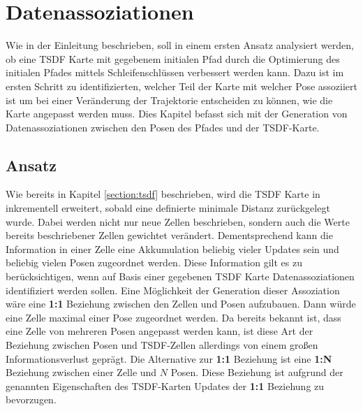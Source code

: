 \chapter{Datenassoziationen}\label{chapter:association}

Wie in der Einleitung beschrieben, soll in einem ersten Ansatz analysiert werden, ob eine TSDF Karte mit gegebenem initialen Pfad durch die Optimierung des initialen Pfades mittels Schleifenschlüssen verbessert werden kann. Dazu ist im ersten Schritt zu identifizierten, welcher Teil der Karte mit welcher Pose assoziiert ist um bei einer Veränderung der Trajektorie entscheiden zu können, wie die Karte angepasst werden muss. Dies Kapitel befasst sich mit der Generation von Datenassoziationen zwischen den Posen des Pfades und der TSDF-Karte.

\section{Ansatz}
\label{section:ansatz}

Wie bereits in Kapitel \ref{section:tsdf} beschrieben, wird die TSDF Karte in \cite{HATSDF} inkrementell erweitert, sobald eine definierte minimale Distanz zurückgelegt wurde. Dabei werden nicht nur neue Zellen beschrieben, sondern auch die Werte bereits beschriebener Zellen gewichtet verändert. Dementsprechend kann die Information in einer Zelle eine Akkumulation beliebig vieler Updates sein und beliebig vielen Posen zugeordnet werden. Diese Information gilt es zu berücksichtigen, wenn auf Basis einer gegebenen TSDF Karte Datenassoziationen identifiziert werden sollen.
Eine Möglichkeit der Generation dieser Assoziation wäre eine \textbf{1:1} Beziehung zwischen den Zellen und Posen aufzubauen. Dann würde eine Zelle maximal einer Pose zugeordnet werden. Da bereits bekannt ist, dass eine Zelle von mehreren Posen angepasst werden kann, ist diese Art der Beziehung zwischen Posen und TSDF-Zellen allerdings von einem großen Informationsverlust geprägt. Die Alternative zur \textbf{1:1} Beziehung ist eine \textbf{1:N} Beziehung zwischen einer Zelle und $N$ Posen. Diese Beziehung ist aufgrund der genannten Eigenschaften des TSDF-Karten Updates der \textbf{1:1} Beziehung zu bevorzugen.

